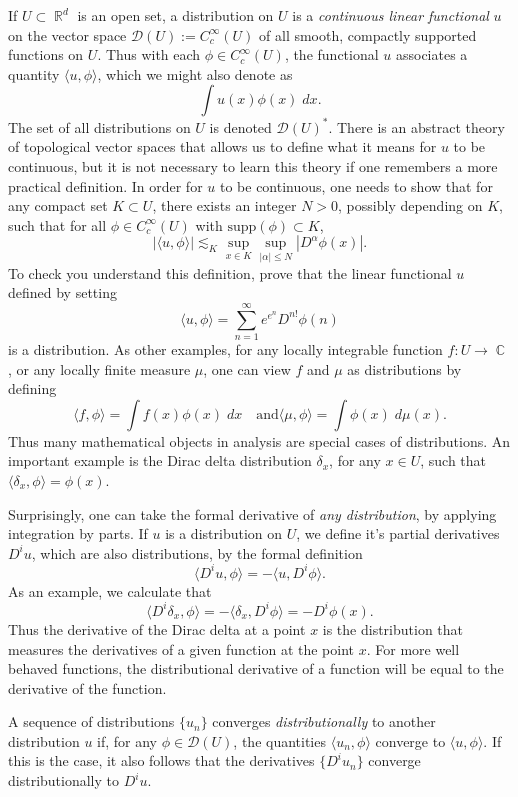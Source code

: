 \documentclass[answers]{exam}
\DeclareMathOperator{\CC}{\mathbb{C}}
\DeclareMathOperator{\RR}{\mathbb{R}}
\begin{document}
\begin{questions}
If $U \subset \RR^d$ is an open set, a distribution on $U$ is a \emph{continuous linear functional} $u$ on the vector space $\mathcal{D}(U) := C_c^\infty(U)$ of all smooth, compactly supported functions on $U$. Thus with each $\phi \in C_c^\infty(U)$, the functional $u$ associates a quantity $\langle u, \phi \rangle$, which we might also denote as
%
\[ \int u(x) \phi(x)\; dx. \]
%
The set of all distributions on $U$ is denoted $\mathcal{D}(U)^*$. There is an abstract theory of topological vector spaces that allows us to define what it means for $u$ to be continuous, but it is not necessary to learn this theory if one remembers a more practical definition. In order for $u$ to be continuous, one needs to show that for any compact set $K \subset U$, there exists an integer $N > 0$, possibly depending on $K$, such that for all $\phi \in C_c^\infty(U)$ with $\text{supp}(\phi) \subset K$,
%
\[ |\langle u, \phi \rangle| \lesssim_K \sup_{x \in K} \sup_{|\alpha| \leq N} |D^\alpha \phi(x)|. \]
%
To check you understand this definition, prove that the linear functional $u$ defined by setting
%
\[ \langle u, \phi \rangle = \sum_{n = 1}^\infty e^{e^{n}} D^{n!} \phi(n) \]
%
is a distribution. As other examples, for any locally integrable function $f: U \to \CC$, or any locally finite measure $\mu$, one can view $f$ and $\mu$ as distributions by defining
%
\[ \langle f, \phi \rangle = \int f(x) \phi(x)\; dx \quad\text{and} \langle \mu, \phi \rangle = \int \phi(x)\; d\mu(x). \]
%
Thus many mathematical objects in analysis are special cases of distributions. An important example is the Dirac delta distribution $\delta_x$, for any $x \in U$, such that $\langle \delta_x, \phi \rangle = \phi(x)$.

Surprisingly, one can take the formal derivative of \emph{any distribution}, by applying integration by parts. If $u$ is a distribution on $U$, we define it's partial derivatives $D^i u$, which are also distributions, by the formal definition
%
\[ \langle D^i u, \phi \rangle = - \langle u, D^i \phi \rangle. \]
%
As an example, we calculate that
%
\[ \langle D^i \delta_x, \phi \rangle = - \langle \delta_x, D^i \phi \rangle = - D^i \phi(x). \]
%
Thus the derivative of the Dirac delta at a point $x$ is the distribution that measures the derivatives of a given function at the point $x$. For more well behaved functions, the distributional derivative of a function will be equal to the derivative of the function.

A sequence of distributions $\{ u_n \}$ converges \emph{distributionally} to another distribution $u$ if, for any $\phi \in \mathcal{D}(U)$, the quantities $\langle u_n, \phi \rangle$ converge to $\langle u, \phi \rangle$. If this is the case, it also follows that the derivatives $\{ D^i u_n \}$ converge distributionally to $D^i u$.


\end{questions}
\end{document}
